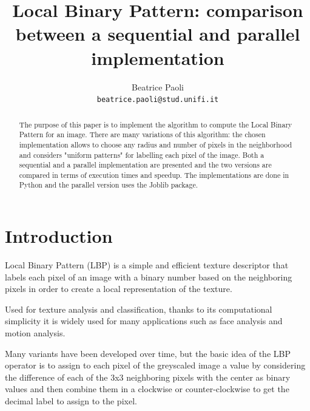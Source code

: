 \documentclass[10pt,twocolumn,letterpaper]{article}
\begin{document}
\title{Local Binary Pattern: comparison between a sequential and parallel implementation}

\author{Beatrice Paoli\\
{\tt\small beatrice.paoli@stud.unifi.it}
}

\maketitle
\thispagestyle{empty}

\begin{abstract}
The purpose of this paper is to implement the algorithm to compute the Local Binary Pattern for an image. There are many variations of this algorithm: the chosen implementation allows to choose any radius and number of pixels in the neighborhood and considers "uniform patterns" for labelling each pixel of the image. Both a sequential and a parallel implementation are presented and the two versions are compared in terms of execution times and speedup. The implementations are done in Python and the parallel version uses the Joblib package.
\end{abstract}


\section{Introduction}
Local Binary Pattern (LBP) is a simple and efficient texture descriptor that labels each pixel of an image with a binary number based on the neighboring pixels in order to create a local representation of the texture.

Used for texture analysis and classification, thanks to its computational simplicity it is widely used for many applications such as face analysis and motion analysis.

Many variants have been developed over time, but the basic idea of the LBP operator is to assign to each pixel of the greyscaled image a value by 
considering the difference of each of the 3x3 neighboring pixels with the center as binary values and then combine them in a clockwise or counter-clockwise to get the decimal label to assign to the pixel.
\end{document}
